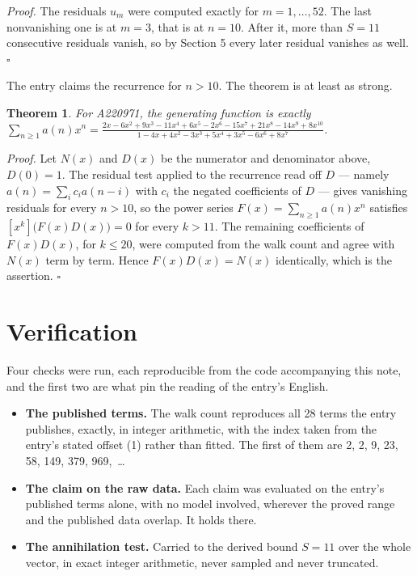 \documentclass[11pt]{article}
\newtheorem{theorem}{Theorem}
\theoremstyle{definition}
\begin{document}
{\itshape Proof.} The residuals $u_m$ were computed exactly for $m = 1,\dots,52$. The last nonvanishing one is at $m = 3$, that is at $n = 10$. After it, more than $S = 11$ consecutive residuals vanish, so by Section 5 every later residual vanishes as well. $\square$

The entry claims the recurrence for $n > 10$. The theorem is at least as strong.

\begin{theorem} For A220971, the generating function is exactly $\sum_{n\ge 1} a(n)x^n = \frac{2x - 6x^{2} + 9x^{3} - 11x^{4} + 6x^{5} - 2x^{6} - 15x^{7} + 21x^{8} - 14x^{9} + 8x^{10}}{1 - 4x + 4x^{2} - 3x^{3} + 5x^{4} + 3x^{5} - 6x^{6} + 8x^{7}}$.\end{theorem}

{\itshape Proof.} Let $N(x)$ and $D(x)$ be the numerator and denominator above, $D(0)=1$. The residual test applied to the recurrence read off $D$ --- namely $a(n) = \sum_i c_i a(n-i)$ with $c_i$ the negated coefficients of $D$ --- gives vanishing residuals for every $n > 10$, so the power series $F(x)=\sum_{n\ge 1}a(n)x^n$ satisfies $[x^k]\bigl(F(x)D(x)\bigr) = 0$ for every $k > 11$. The remaining coefficients of $F(x)D(x)$, for $k \le 20$, were computed from the walk count and agree with $N(x)$ term by term. Hence $F(x)D(x) = N(x)$ identically, which is the assertion. $\square$

\section{Verification}

Four checks were run, each reproducible from the code accompanying this note, and the first two are what pin the reading of the entry's English.

\begin{itemize}

\item {\bfseries The published terms.} The walk count reproduces all 28 terms the entry publishes, exactly, in integer arithmetic, with the index taken from the entry's stated offset (1) rather than fitted. The first of them are 2, 2, 9, 23, 58, 149, 379, 969,~\dots

\item {\bfseries The claim on the raw data.} Each claim was evaluated on the entry's published terms alone, with no model involved, wherever the proved range and the published data overlap. It holds there.

\item {\bfseries The annihilation test.} Carried to the derived bound $S = 11$ over the whole vector, in exact integer arithmetic, never sampled and never truncated.

\end{itemize}
\end{document}
